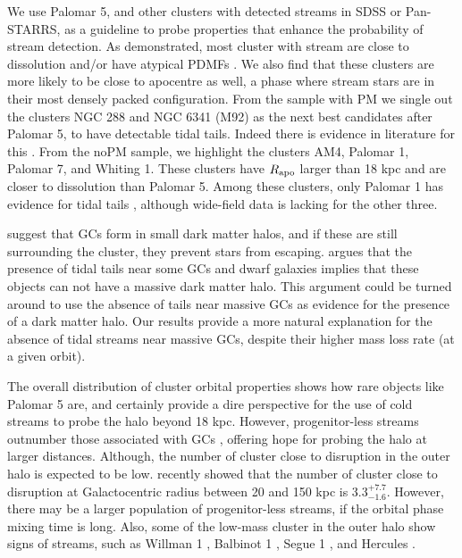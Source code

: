 \documentclass[useAMS,usenatbib,fleqn]{mnras}
\newcommand{\rapo}{R_{\rm apo}}
\newcommand{\comm}[1]{#1}
\begin{document}
We use Palomar 5, and other clusters with detected streams in SDSS or
Pan-STARRS, as a guideline to probe properties that enhance the probability of
stream detection. As demonstrated, most cluster with stream are close to
dissolution \comm{and/or have atypical PDMFs \citep{Webb17}}. We also find that these clusters
are more likely to be close to apocentre as well, a phase where stream stars are
in their most densely packed configuration. From the sample with PM we single
out the clusters NGC 288 and NGC 6341 (M92) as the next best candidates after
Palomar 5, to have detectable tidal tails. Indeed there is evidence in
literature for this \citep{Lee03, Grillmair04}. From the noPM sample, we
highlight the clusters AM4, Palomar 1, Palomar 7, and Whiting 1. These clusters
have $\rapo$ larger than 18 kpc and are closer to dissolution than Palomar 5.
Among these clusters, only Palomar 1 has evidence for tidal tails \citep{pal1},
although wide-field data is lacking for the other three. 

\citet{1984ApJ...277..470P} suggest that GCs form in small dark
matter halos, and if these are still surrounding the cluster, they prevent stars
from escaping.  \citet{1996ApJ...461L..13M} argues that the presence of tidal
tails near some GCs and dwarf galaxies implies that these objects can not have a
massive  dark matter halo. This argument could be turned around to use the
absence of tails near massive GCs \citep[e.g.][]{Kuzma16} as evidence for the
presence of a dark matter halo. Our results provide a more natural explanation
for the absence of tidal streams near massive GCs, despite their higher mass
loss rate (at a given orbit).

The overall distribution of cluster orbital properties shows how rare objects
like Palomar 5 are, and certainly provide a dire perspective for the use of cold
streams to probe the halo beyond 18 kpc. However, progenitor-less streams
outnumber those associated with GCs \citep[for recent
discoveries see][]{Bernard16}, offering hope for probing the halo at
larger distances. Although, the number of cluster close to disruption in the
outer halo is expected to be low. \citet{Contenta17} recently showed that
the number of cluster close to disruption at Galactocentric radius between
20 and 150 kpc is $3.3^{+7.7}_{-1.6}$. However, there may be a larger
population of progenitor-less streams, if the orbital phase mixing time is
long. Also, some of the  low-mass cluster in the outer halo show signs of
streams, such as Willman 1 \citep{Willman06}, Balbinot 1 \citep{Bernard16}, 
Segue 1 \citep{segue1tail}, \comm{and Hercules \citep{Kuepper17}}.
\end{document}
